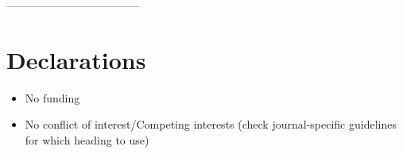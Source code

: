\documentclass[pdflatex,sn-mathphys-num]{sn-jnl}%
\theoremstyle{thmstyleone}%
\theoremstyle{thmstyletwo}%
\theoremstyle{thmstylethree}%
\begin{document}
\backmatter



------------------------------------

\section*{Declarations}



\begin{itemize}
\item No funding
\item No conflict of interest/Competing interests (check journal-specific guidelines for which heading to use)
\end{itemize}

\noindent



\end{document}
